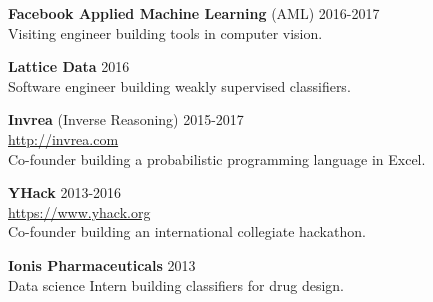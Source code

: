 \documentclass[margin, 10pt]{res} %
\begin{document}
\begin{resume}
\textbf{Facebook Applied Machine Learning} (AML) \hfill 2016-2017 \\
Visiting engineer building tools in computer vision.

\textbf{Lattice Data} \hfill 2016 \\
Software engineer building weakly supervised classifiers.

\textbf{Invrea} (Inverse Reasoning) \hfill 2015-2017 \\
\url{http://invrea.com} \\
Co-founder building a probabilistic programming language in Excel.

\textbf{YHack} \hfill 2013-2016 \\
\url{https://www.yhack.org} \\
Co-founder building an international collegiate hackathon.

\textbf{Ionis Pharmaceuticals} \hfill 2013 \\
Data science Intern building classifiers for drug design.


\end{resume}
\end{document}
